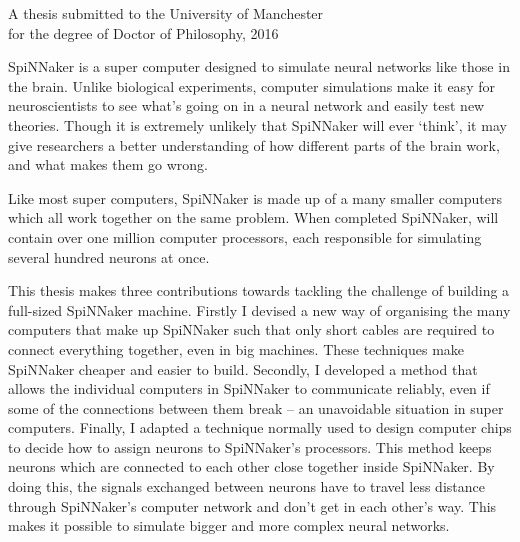 {
	
	
	
	\vfill
	
	\begin{center}
		\textsc{\large\thesistitle}
		
		\vspace{0.5em}
		
		\thesisauthor
		
		\vspace{0.5em}
		
		A thesis submitted to the University of Manchester\\
		for the degree of Doctor of Philosophy, 2016
	\end{center}
	
	\vfill
	
	
	SpiNNaker is a super computer designed to simulate neural networks like those
	in the brain. Unlike biological experiments, computer simulations make it
	easy for neuroscientists to see what's going on in a neural network and
	easily test new theories. Though it is extremely unlikely that SpiNNaker will
	ever `think', it may give researchers a better understanding of how different
	parts of the brain work, and what makes them go wrong.
	
	Like most super computers, SpiNNaker is made up of a many smaller computers
	which all work together on the same problem. When completed SpiNNaker, will
	contain over one million computer processors, each responsible for simulating
	several hundred neurons at once.
	
	This thesis makes three contributions towards tackling the challenge of
	building a full-sized SpiNNaker machine. Firstly I devised a new way of
	organising the many computers that make up SpiNNaker such that only short
	cables are required to connect everything together, even in big machines.
	These techniques make SpiNNaker cheaper and easier to build.  Secondly, I
	developed a method that allows the individual computers in SpiNNaker to
	communicate reliably, even if some of the connections between them break --
	an unavoidable situation in super computers. Finally, I adapted a technique
	normally used to design computer chips to decide how to assign neurons to
	SpiNNaker's processors. This method keeps neurons which are connected to each
	other close together inside SpiNNaker. By doing this, the signals exchanged
	between neurons have to travel less distance through SpiNNaker's computer
	network and don't get in each other's way. This makes it possible to simulate
	bigger and more complex neural networks.
	
	\par%
}

